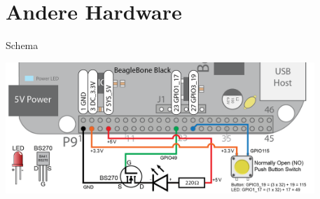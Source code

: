\section{Andere Hardware}
\begin{frame}{Schema}
\begin{center}
 \includegraphics[width=0.875\textwidth]{Button-and-LED-large.png}
\end{center}
\end{frame}


